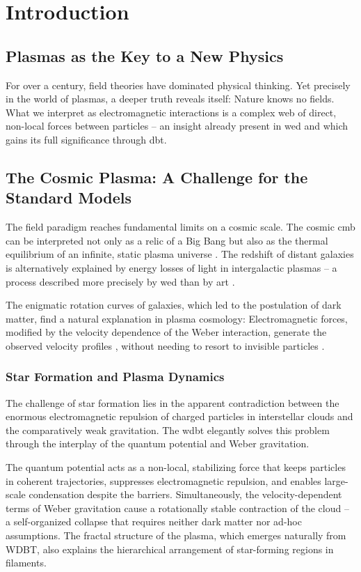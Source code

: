\chapter{Introduction}
\section{Plasmas as the Key to a New Physics}
For over a century, field theories have dominated physical thinking. Yet precisely in the world of plasmas, a deeper truth reveals itself: Nature knows no fields. What we interpret as electromagnetic interactions is a complex web of direct, non-local forces between particles – an insight already present in \gls{wed} and which gains its full significance through \gls{dbt}.

\section{The Cosmic Plasma: A Challenge for the Standard Models}
The field paradigm reaches fundamental limits on a cosmic scale. The cosmic \gls{cmb} can be interpreted not only as a relic of a Big Bang but also as the thermal equilibrium of an infinite, static plasma universe \cite{Arp1998}. The redshift of distant galaxies is alternatively explained by energy losses of light in intergalactic plasmas – a process described more precisely by \gls{wed} than by \gls{art} \cite{einstein1915,LaViolette2010}.

The enigmatic rotation curves of galaxies, which led to the postulation of dark matter, find a natural explanation in plasma cosmology: Electromagnetic forces, modified by the velocity dependence of the Weber interaction, generate the observed velocity profiles \cite{rubin1970}, without needing to resort to invisible particles \cite{Milgrom2015}.

\subsection{Star Formation and Plasma Dynamics}
The challenge of star formation lies in the apparent contradiction between the enormous electromagnetic repulsion of charged particles in interstellar clouds and the comparatively weak gravitation. The \gls{wdbt} elegantly solves this problem through the interplay of the quantum potential and Weber gravitation.

The quantum potential acts as a non-local, stabilizing force that keeps particles in coherent trajectories, suppresses electromagnetic repulsion, and enables large-scale condensation despite the barriers. Simultaneously, the velocity-dependent terms of Weber gravitation cause a rotationally stable contraction of the cloud – a self-organized collapse that requires neither dark matter nor ad-hoc assumptions. The fractal structure of the plasma, which emerges naturally from WDBT, also explains the hierarchical arrangement of star-forming regions in filaments.

